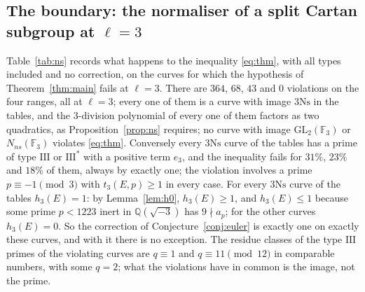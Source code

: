 \documentclass[11pt]{amsart}
\theoremstyle{definition}
\newcommand{\Q}{\mathbb{Q}}
\newcommand{\F}{\mathbb{F}}
\newcommand{\Ns}{3\mathrm{Ns}}
\begin{document}
\subsection{The boundary: the normaliser of a split Cartan subgroup at \texorpdfstring{$\ell=3$}{l=3}}\label{sec:anomaly}
Table~\ref{tab:ns} records what happens to the inequality \eqref{eq:thm}, with all types included and no correction, on the curves for which the hypothesis of Theorem~\ref{thm:main} fails at $\ell=3$. There are $364$, $68$, $43$ and $0$ violations on the four ranges, all at $\ell=3$; every one of them is a curve with image $\Ns$ in the tables, and the $3$-division polynomial of every one of them factors as two quadratics, as Proposition~\ref{prop:ns} requires; no curve with image $\mathrm{GL}_2(\F_3)$ or $N_{ns}(\F_3)$ violates \eqref{eq:thm}. Conversely every $\Ns$ curve of the tables has a prime of type $\mathrm{III}$ or $\mathrm{III}^*$ with a positive term $e_3$, and the inequality fails for $31\%$, $23\%$ and $18\%$ of them, always by exactly one; the violation involves a prime $p\equiv-1\pmod3$ with $t_3(E,p)\ge1$ in every case. For every $\Ns$ curve of the tables $h_3(E)=1$: by Lemma~\ref{lem:h0}, $h_3(E)\ge1$, and $h_3(E)\le1$ because some prime $p<1223$ inert in $\Q(\sqrt{-3})$ has $9\nmid a_p$; for the other curves $h_3(E)=0$. So the correction of Conjecture~\ref{conj:euler} is exactly one on exactly these curves, and with it there is no exception. The residue classes of the type $\mathrm{III}$ primes of the violating curves are $q\equiv1$ and $q\equiv11\pmod{12}$ in comparable numbers, with some $q=2$; what the violations have in common is the image, not the prime.

\begin{table}[ht]\centering\scriptsize\setlength{\tabcolsep}{3pt}

\caption{The curves with image $\Ns$ (mod $3$ image the normaliser of a split Cartan subgroup), with $E[3]$ irreducible, not CM, optimal: how many have a positive type $\mathrm{III}$ term, how many violate \eqref{eq:thm} (all types, no correction), how many other curves do, how many have $h_3(E)=1$, the residue classes mod $12$ of the type $\mathrm{III}$ primes of the violating curves (or $q=2$), and the shortfall.}\label{tab:ns}
\end{table}
\end{document}
